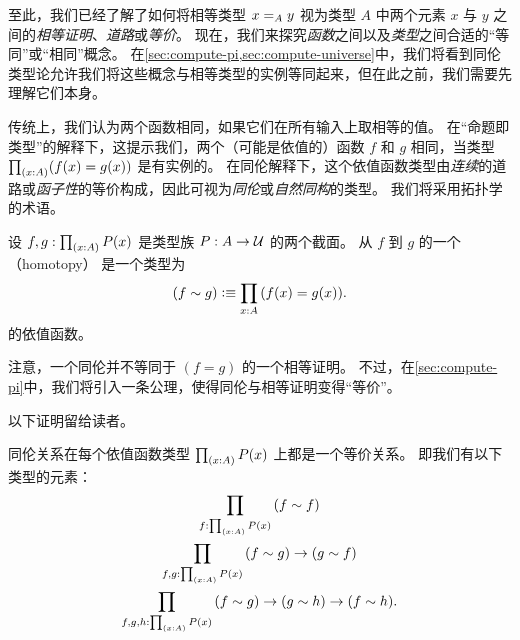 %

至此，我们已经了解了如何将相等类型 $\id[A]xy$ 视为类型 $A$ 中两个元素 $x$ 与 $y$ 之间的\emph{相等证明}、\emph{道路}或\emph{等价}。
现在，我们来探究\emph{函数}之间以及\emph{类型}之间合适的``等同''或``相同''概念。
在\cref{sec:compute-pi,sec:compute-universe}中，我们将看到同伦类型论允许我们将这些概念与相等类型的实例等同起来，但在此之前，我们需要先理解它们本身。

传统上，我们认为两个函数相同，如果它们在所有输入上取相等的值。
在``命题即类型''的解释下，这提示我们，两个（可能是依值的）函数 $f$ 和 $g$ 相同，当类型 $\prd{x:A} (f(x)=g(x))$ 是有实例的。
在同伦解释下，这个依值函数类型由\emph{连续}的道路或\emph{函子性}的等价构成，因此可视为\emph{同伦}或\emph{自然同构}的类型。
我们将采用拓扑学的术语。

\begin{defn} \label{defn:homotopy}
  设 $f,g:\prd{x:A} P(x)$ 是类型族 $P:A\to\type$ 的两个截面。
  从 $f$ 到 $g$ 的一个（homotopy）
  是一个类型为
  \begin{equation*}
    (f\htpy g) \defeq \prd{x:A} (f(x)=g(x)).
  \end{equation*}
  的依值函数。
\end{defn}

注意，一个同伦并不等同于 $(f=g)$ 的一个相等证明。
不过，在\cref{sec:compute-pi}中，我们将引入一条公理，使得同伦与相等证明变得``等价''。

以下证明留给读者。

\begin{lem}\label{lem:homotopy-props}
  同伦关系在每个依值函数类型 $\prd{x:A} P(x)$ 上都是一个等价关系。
  即我们有以下类型的元素：
  \begin{gather*}
    \prd{f:\prd{x:A} P(x)} (f\htpy f)\\
    \prd{f,g:\prd{x:A} P(x)} (f\htpy g) \to (g\htpy f)\\
    \prd{f,g,h:\prd{x:A} P(x)} (f\htpy g) \to (g\htpy h) \to (f\htpy h).
  \end{gather*}
\end{lem}


